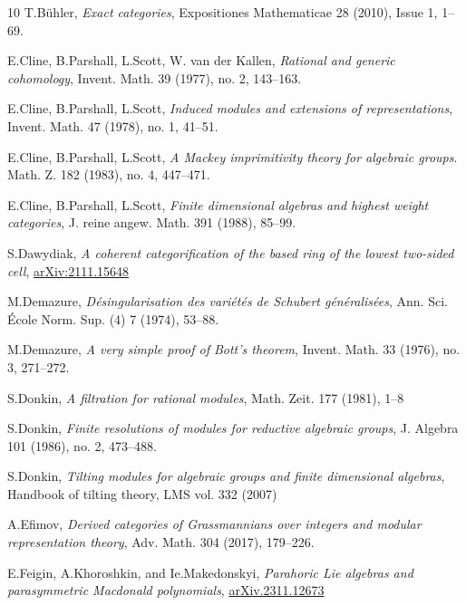 \documentclass[sn-mathphys-num]{sn-jnl}%
\theoremstyle{definition}
\begin{document}
\begin{thebibliography}{10}
 T.B\"uhler, {\it Exact categories}, Expositiones Mathematicae
28 (2010), Issue 1,  1--69.

E.Cline, B.Parshall, L.Scott, W. van der Kallen, {\it Rational and generic cohomology}, Invent. Math. 39 (1977), no. 2, 143--163.

E.Cline, B.Parshall, L.Scott, {\it Induced modules and extensions of representations},   Invent. Math. 47 (1978), no. 1, 41--51.

E.Cline, B.Parshall, L.Scott, {\it A Mackey imprimitivity theory for algebraic groups}. Math. Z. 182 (1983), no. 4, 447--471.

E.Cline, B.Parshall, L.Scott, {\it Finite dimensional algebras and highest
weight categories},   J. reine angew. Math. 391 (1988), 85--99.


S.Dawydiak, {\it A coherent categorification of the based ring of the lowest two-sided cell}, 
\href{https://doi.org/10.48550/arXiv.2111.15648}{arXiv:2111.15648}

M.Demazure, {\it D\'esingularisation des vari\'et\'es de Schubert g\'en\'eralis\'ees}, Ann. Sci. \'Ecole Norm. Sup. (4) 7 (1974), 53--88.

M.Demazure, {\it A very simple proof of Bott's theorem}, 
Invent. Math. 33 (1976), no. 3, 271--272.

S.Donkin, {\it A filtration for rational modules}, Math. Zeit. 177 (1981), 1--8

S.Donkin, {\it Finite resolutions of modules for reductive algebraic groups}, J. Algebra 101 (1986), no. 2, 473--488. 

S.Donkin, {\it Tilting modules for algebraic groups and finite dimensional algebras}, Handbook of tilting theory, LMS vol. 332 (2007)

A.Efimov, {\it Derived categories of Grassmannians over integers and modular representation theory}, Adv. Math. 304 (2017), 179--226. 

E.Feigin, A.Khoroshkin, and Ie.Makedonskyi, {\it Parahoric Lie algebras and parasymmetric Macdonald polynomials},
\href{https://doi.org/10.48550/arXiv.2311.12673}{arXiv.2311.12673}


\end{thebibliography}
\end{document}

